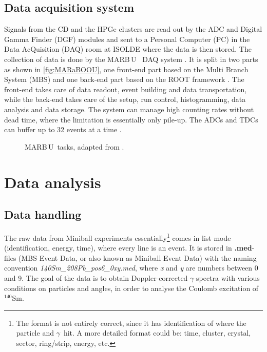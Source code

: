 \documentclass[twoside,english]{uiofysmaster/uiofysmaster}
\newcommand{\Sm}{$^{140}$Sm} %
\newcommand{\ga}{$\gamma$}
\newcommand{\MBOU}{MAR\belowbaseline[-2pt]{a}B\stackinset{l}{3pt}{b}{-3pt}{O}{O}\,U}
\begin{document}
\section{Data acquisition system}
Signals from the CD and the HPGe clusters are read out by the ADC and Digital Gamma Finder (DGF) modules and sent to a Personal Computer (PC) in the Data AcQuisition (DAQ) room at ISOLDE where the data is then stored. The collection of data is done by the \MBOU\ \cite{Maraboou} DAQ system \cite{MB-spect}. It is split in two parts as shown in \autoref{fig:MARaBOOU}, one front-end part based on the Multi Branch System (MBS) \cite{MBS} and one back-end part based on the ROOT framework \cite{ROOT}. The front-end takes care of data readout, event building and data transportation, while the back-end takes care of the setup, run control, histogramming, data analysis and data storage. The system can manage high counting rates without dead time, where the limitation is essentially only pile-up. The ADCs and TDCs can buffer up to 32 events at a time \cite{MB-spect}. 


\begin{figure}[ht]
	\centering
	
	\caption{\protect\MBOU\ tasks, adapted from \cite{Maraboou}.}
	\label{fig:MARaBOOU}
\end{figure}




\chapter{Data analysis}  

\section{Data handling}
The raw data from Miniball experiments essentially\footnote{The format is not entirely correct, since it has identification of where the particle and \ga\ hit. A more detailed format could be: time, cluster, crystal, sector, ring/strip, energy, etc.} comes in list mode (identification, energy, time), where every line is an event. It is stored in \textbf{.med}-files (MBS Event Data, or also known as Miniball Event Data) with the naming convention \textit{140Sm\_208Pb\_pos6\_0xy.med}, where \textit{x} and \textit{y} are numbers between 0 and 9. The goal of the data is to obtain Doppler-corrected \ga-spectra with various conditions on particles and angles, in order to analyse the Coulomb excitation of \Sm. 
\end{document}
